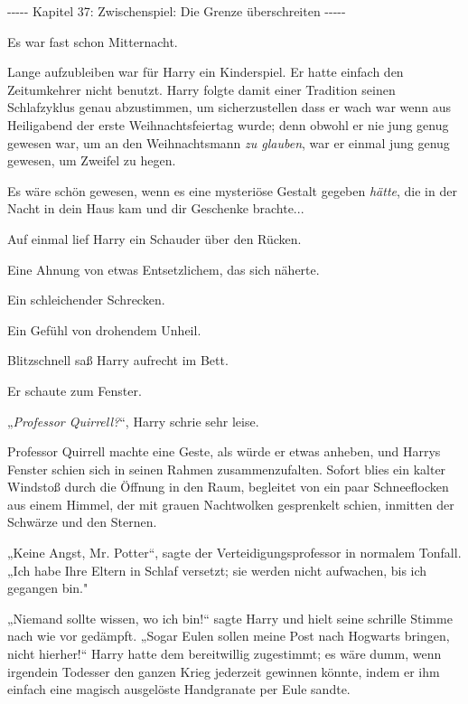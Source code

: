 

\hypertarget{zwischenspiel-die-grenze-uxfcberschreiten}{%

-\/-\/-\/-\/- Kapitel 37: Zwischenspiel: Die Grenze überschreiten -\/-\/-\/-\/-

Es war fast schon Mitternacht.

Lange aufzubleiben war für Harry ein Kinderspiel. Er hatte einfach den Zeitumkehrer nicht benutzt. Harry folgte damit einer Tradition seinen Schlafzyklus genau abzustimmen, um sicherzustellen dass er wach war wenn aus Heiligabend der erste Weihnachtsfeiertag wurde; denn obwohl er nie jung genug gewesen war, um an den Weihnachtsmann \emph{zu glauben}, war er einmal jung genug gewesen, um Zweifel zu hegen.

Es wäre schön gewesen, wenn es eine mysteriöse Gestalt gegeben \emph{hätte}, die in der Nacht in dein Haus kam und dir Geschenke brachte...

Auf einmal lief Harry ein Schauder über den Rücken.

Eine Ahnung von etwas Entsetzlichem, das sich näherte.

Ein schleichender Schrecken.

Ein Gefühl von drohendem Unheil.

Blitzschnell saß Harry aufrecht im Bett.

Er schaute zum Fenster.

„\emph{Professor Quirrell?}“, Harry schrie sehr leise.

Professor Quirrell machte eine Geste, als würde er etwas anheben, und Harrys Fenster schien sich in seinen Rahmen zusammenzufalten. Sofort blies ein kalter Windstoß durch die Öffnung in den Raum, begleitet von ein paar Schneeflocken aus einem Himmel, der mit grauen Nachtwolken gesprenkelt schien, inmitten der Schwärze und den Sternen.

„Keine Angst, Mr. Potter“, sagte der Verteidigungsprofessor in normalem Tonfall. „Ich habe Ihre Eltern in Schlaf versetzt; sie werden nicht aufwachen, bis ich gegangen bin."

„Niemand sollte wissen, wo ich bin!“ sagte Harry und hielt seine schrille Stimme nach wie vor gedämpft. „Sogar Eulen sollen meine Post nach Hogwarts bringen, nicht hierher!“ Harry hatte dem bereitwillig zugestimmt; es wäre dumm, wenn irgendein Todesser den ganzen Krieg jederzeit gewinnen könnte, indem er ihm einfach eine magisch ausgelöste Handgranate per Eule sandte.

}
